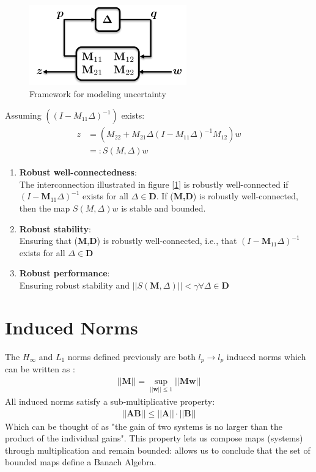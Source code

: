 \documentclass{article}[12pt]
\newcommand{\norm}[1]{\left|\left|#1\right|\right|}
\begin{document}
\begin{figure} [H]
    \centering
    \includegraphics[scale=.7]{figures/deltablock.png}
    \caption{Framework for modeling uncertainty}
    \label{fig:delta}
\end{figure}

Assuming $((I - M_{11}\Delta)^{-1})$ exists:
\begin{align*}
        z &= (M_{22} + M_{21}\Delta(I - M_{11}\Delta)^{-1}M_{12})w\\
    &=: S(M,\Delta)w
\end{align*}
\begin{enumerate}
    \item \textbf{Robust well-connectedness}:\\
    The interconnection illustrated in figure [\ref{fig:delta}] is robustly well-connected if $(I - \textbf{M}_{11}\Delta)^{-1}$ exists for all $\Delta \in \textbf{D}$. If (\textbf{M,D}) is robustly well-connected, then the map $S(M,\Delta)w$ is stable and bounded.
    \item \textbf{Robust stability}:\\
    Ensuring that (\textbf{M},\textbf{D}) is robustly well-connected, i.e., that  $(I - \textbf{M}_{11}\Delta)^{-1}$ exists for all $\Delta \in \textbf{D}$
    \item \textbf{Robust performance}:\\
    Ensuring robust stability and $\norm{S(\textbf{M}, \Delta)} < \gamma \forall \Delta \in \textbf{D}$
\end{enumerate}


\section{Induced Norms}
The $H_{\infty}$ and $L_1$ norms defined previously are both $l_p \xrightarrow{} l_p$ induced norms which can be written as :
\begin{align*}
    \norm{\textbf{M}} = \sup_{\norm{\textbf{w}}\leq 1} \norm{\textbf{Mw}}
\end{align*}
All induced norms satisfy a sub-multiplicative property:
\begin{align*}
    \norm{\textbf{AB}} \leq \norm{\textbf{A}} \cdot \norm{\textbf{B}}
\end{align*}
Which can be thought of as "the gain of two systems is no larger than the product of the individual gains". This property lets us compose maps (systems) through multiplication and remain bounded: allows us to conclude that the set of bounded maps define a Banach Algebra.
\end{document}
